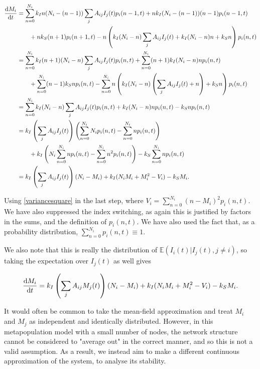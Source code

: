 \documentclass[12pt,a4paper,openany,twoside]{book}
\renewcommand{\d}{{\mathrm d}}
\newcommand{\fd}[2]{\mathchoice{\frac{\d #1}{\d #2}}{\d #1/\d #2}{\d #1/\d #2}{\d #1/\d #2}}
\begin{document}
\begin{equation}
\begin{aligned}
	\fd {M_i} {t} &= \sum_{n = 0}^{N_i} k_I n (N_i - (n-1)) \sum_j A_{ij} I_j(t) p_i(n-1, t) + n k_I(N_i - (n-1))(n-1) p_i(n-1, t) \notag \\
	&\qquad + n k_S (n+1) p_i(n+1, t) - n \left( k_I (N_i - n) \sum_j A_{ij} I_j(t) + k_I (N_i - n) n + k_S n \right) p_i(n, t) \\
	&= \sum_{n = 0}^{N_i} k_I (n+1) (N_i - n) \sum_j A_{ij} I_j(t) p_i(n, t) + \sum_{n = 0}^{N_i} (n+1) k_I (N_i - n) n p_i(n, t)\notag \\
	&\qquad + \sum_{n = 0}^{N_i} (n-1) k_S n p_i(n, t) - \sum_{n = 0}^{N_i} n \left( k_I (N_i - n) \left( \sum_j A_{ij} I_j(t) + n \right)+ k_S n \right) p_i(n, t) \\
	&= \sum_{n = 0}^{N_i} k_I (N_i - n) \sum_j A_{ij} I_j(t) p_i(n, t) + k_I (N_i - n) n p_i(n, t)- k_S n p_i(n ,t) \\
	&= k_I \left(\sum_j A_{ij} I_j(t) \right) \left( \sum_{n = 0}^{N_i} N_i p_i(n ,t) - \sum_{n = 0}^{N_i} n p_i(n, t) \right) \notag \\
	&\qquad + k_I \left(N_i \sum_{n = 0}^{N_i} n p_i(n, t) - \sum_{n = 0}^{N_i} n^2 p_i(n, t) \right) - k_S \sum_{n = 0}^{N_i} n p_i(n, t) \\
	&= k_I \left( \sum_j A_{ij} I_j(t) \right) (N_i - M_i) + k_I(N_i M_i + M_i^2 - V_i) - k_S M_i. \label{SISmetameans}
\end{aligned}
\end{equation}

Using \ref{variancesquare} in the last step, where $V_i = \sum_{n=0}^{N_i} (n-M_i)^2 p_i(n, t)$. We have also suppressed the index switching, as again this is justified by factors in the sums, and the definition of $p_i(n, t)$. We have also used the fact that, as a probability distribution, $\sum_{n=0}^{N_i} p_i(n, t) \equiv 1$.

We also note that this is really the distribution of $\mathbb{E}(I_i(t) | I_j(t), j \neq i)$, so taking the expectation over $I_j(t)$ as well gives

\begin{equation}
	\fd {M_i} {t} = k_I \left( \sum_j A_{ij} M_j(t) \right) (N_i - M_i) + k_I (N_i M_i + M_i^2 - V_i) - k_S M_i.
\end{equation}

It would often be common to take the mean-field approximation and treat $M_i$ and $M_j$ as independent and identically distributed. However, in this metapopulation model with a small number of nodes, the network structure cannot be considered to "average out" in the correct manner, and so this is not a valid assumption. As a result, we instead aim to make a different continuous approximation of the system, to analyse its stability.
\end{document}
